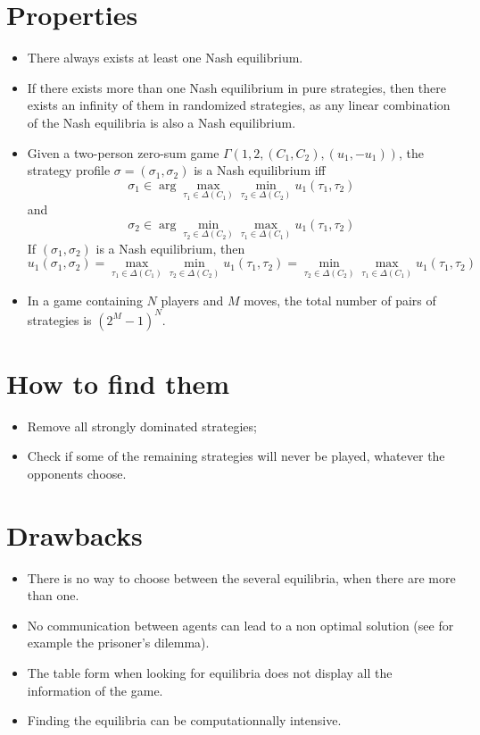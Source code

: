 \documentclass[12pt, openany]{report}
\theoremstyle{definition}
\begin{document}
\section{Properties}
\begin{itemize}
	\item There always exists at least one Nash equilibrium.
	\item If there exists more than one Nash equilibrium in pure strategies, then there exists an infinity of them in randomized strategies, as any linear combination of the Nash equilibria is also a Nash equilibrium.
	\item Given a two-person zero-sum game $\Gamma({1,2},(C_1,C_2), (u_1,-u_1))$, the strategy profile $\sigma=(\sigma_1,\sigma_2)$ is a Nash equilibrium iff 
	\begin{equation}
		\sigma_1\in \arg\max_{\tau_1\in \Delta (C_1)}\min_{\tau_2\in \Delta (C_2)}u_1(\tau_1,\tau_2)
	\end{equation}
	and 
	\begin{equation}
		\sigma_2\in \arg\min_{\tau_2\in \Delta (C_2)}\max_{\tau_1\in \Delta (C_1)}u_1(\tau_1,\tau_2)
	\end{equation}
	If $(\sigma_1,\sigma_2)$ is a Nash equilibrium, then 
	\begin{equation}
		u_1(\sigma_1,\sigma_2)= \max_{\tau_1\in \Delta (C_1)}\min_{\tau_2\in \Delta (C_2)}u_1(\tau_1,\tau_2)=\min_{\tau_2\in \Delta (C_2)}\max_{\tau_1\in \Delta (C_1)}u_1(\tau_1,\tau_2) 
	\end{equation}
	\item In a game containing $N$ players and $M$ moves, the total number of pairs of strategies is $(2^M-1)^N$. 
\end{itemize}
\section{How to find them}
\begin{itemize}
	\item Remove all strongly dominated strategies;
	\item Check if some of the remaining strategies will never be played, whatever the opponents choose. 
\end{itemize}
\section{Drawbacks}
\begin{itemize}
	\item There is no way to choose between the several equilibria, when there are more than one.
	\item No communication between agents can lead to a non optimal solution (see for example the prisoner's dilemma).
	\item The table form when looking for equilibria does not display all the information of the game.
	\item Finding the equilibria can be computationnally intensive.
\end{itemize}
\end{document}
